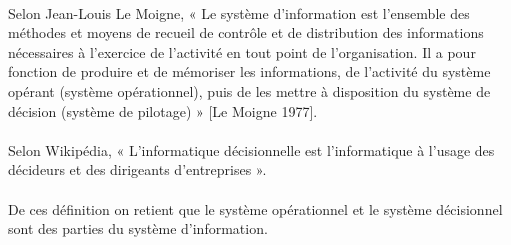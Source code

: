   \paragraph{}
  Selon Jean-Louis Le Moigne,  « Le système d’information est l’ensemble des méthodes et moyens de recueil de contrôle et de distribution des informations nécessaires à l’exercice de l’activité en tout point de l’organisation. Il a pour fonction de produire et de mémoriser les informations, de l’activité du système opérant (système opérationnel), puis de les mettre à disposition du système de décision (système de pilotage) » [Le Moigne 1977].
  \paragraph{}
  Selon Wikipédia, « L’informatique décisionnelle est l'informatique à l'usage des décideurs et des dirigeants    d'entreprises ».
  \paragraph{}
  De ces définition on retient que le système opérationnel et le système décisionnel sont des parties du                  système d’information. 
 


